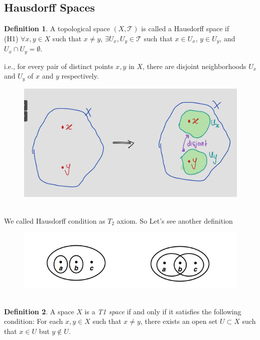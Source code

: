 \documentclass[
]{book}
\theoremstyle{definition}
\newtheorem{definition}{Definition}[chapter]
\theoremstyle{definition}
\theoremstyle{definition}
\theoremstyle{definition}
\theoremstyle{remark}
\begin{document}
\hypertarget{hausdorff-spaces}{%
\subsection{Hausdorff Spaces}\label{hausdorff-spaces}}

\begin{definition}
\protect\hypertarget{def:unnamed-chunk-75}{}\label{def:unnamed-chunk-75}A topological space \((X,\mathcal{T})\) is called a Hausdorff space if\\
(H1) \(\forall x,y \in X\) such that \(x \neq y\), \(\exists U_x, U_y \in \mathcal{T}\) such that \(x \in U_x\), \(y \in U_y\), and \(U_x \cap U_y = \emptyset\).

i.e., for every pair of distinct points \(x, y\) in \(X\), there are disjoint neighborhoods \(U_x\) and \(U_y\) of \(x\) and \(y\) respectively.
\end{definition}

\begin{figure}
\centering
\includegraphics{figures/figure 16.jpg}
\caption{\label{fig:fig16}\(~\)}
\end{figure}

We called Hausdorff condition as \(T_2\) axiom. So Let's see another definition

\begin{figure}
\centering
\includegraphics{figures/figure 02.png}
\caption{\label{fig:fig02}\(~\)}
\end{figure}

\begin{definition}
\protect\hypertarget{def:unnamed-chunk-76}{}\label{def:unnamed-chunk-76}A space \(X\) is a \emph{T1 space} if and only if it satisfies the following condition: For each \(x, y \in X\) such that \(x \neq y\), there exists an open set \(U \subset X\) such that \(x \in U\) but \(y \notin U\).
\end{definition}
\end{document}
